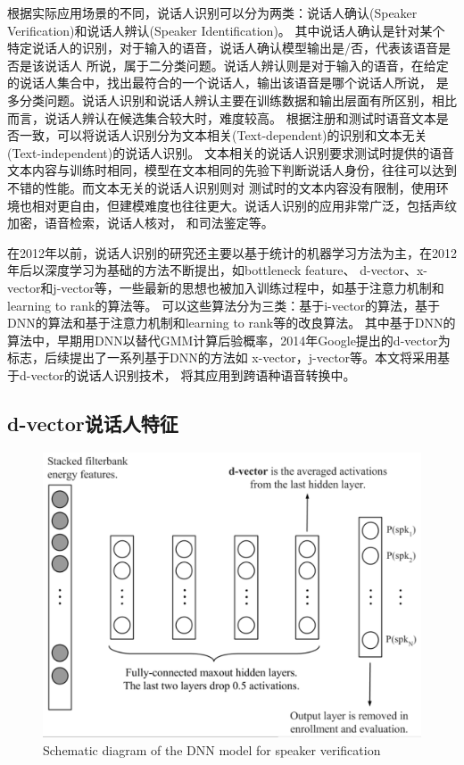 根据实际应用场景的不同，说话人识别可以分为两类：说话人确认(Speaker Verification)和说话人辨认(Speaker Identification)。
其中说话人确认是针对某个特定说话人的识别，对于输入的语音，说话人确认模型输出是/否，代表该语音是否是该说话人
所说，属于二分类问题。说话人辨认则是对于输入的语音，在给定的说话人集合中，找出最符合的一个说话人，输出该语音是哪个说话人所说，
是多分类问题。说话人识别和说话人辨认主要在训练数据和输出层面有所区别，相比而言，说话人辨认在候选集合较大时，难度较高。
根据注册和测试时语音文本是否一致，可以将说话人识别分为文本相关(Text-dependent)的识别和文本无关(Text-independent)的说话人识别。
文本相关的说话人识别要求测试时提供的语音文本内容与训练时相同，模型在文本相同的先验下判断说话人身份，往往可以达到不错的性能。而文本无关的说话人识别则对
测试时的文本内容没有限制，使用环境也相对更自由，但建模难度也往往更大。说话人识别的应用非常广泛，包括声纹加密，语音检索，说话人核对，
和司法鉴定等。

在2012年以前，说话人识别的研究还主要以基于统计的机器学习方法为主，在2012年后以深度学习为基础的方法不断提出，如bottleneck feature、
d-vector、x-vector和j-vector等，一些最新的思想也被加入训练过程中，如基于注意力机制和learning to rank的算法等。
可以这些算法分为三类：基于i-vector的算法，基于DNN的算法和基于注意力机制和learning to rank等的改良算法。
其中基于DNN的算法中，早期用DNN以替代GMM计算后验概率，2014年Google提出的d-vector为标志\cite{variani2014deep}，后续提出了一系列基于DNN的方法如
x-vector，j-vector等\cite{snyder2016deep,chen2015multi,shi2017double}。本文将采用基于d-vector的说话人识别技术，
将其应用到跨语种语音转换中。

\subsection{d-vector说话人特征}

\begin{figure}[!htp]
    \centering
    \includegraphics[width=12cm,trim=0 10 0 0,clip]{figure/5_dvector.png}
    {Schematic diagram of the DNN model for speaker verification}
    \label{fig:dvector}
\end{figure}

